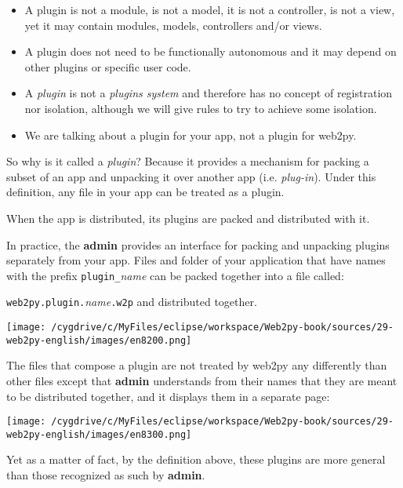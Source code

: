 \documentclass[justified,sixbynine,notoc]{tufte-book}
\def\ft{\small\tt}
\begin{document}
\begin{fullwidth}
\begin{itemize}
\item A plugin is not a module, is not a model, it is not a controller, is not a view, yet it may contain modules, models, controllers and/or views.

\item A plugin does not need to be functionally autonomous and it may depend on other plugins or specific user code.

\item A {\it plugin} is not a {\it plugins system} and therefore has no concept of registration nor isolation, although we will give rules to try to achieve some isolation.

\item We are talking about a plugin for your app, not a plugin for web2py.
\end{itemize}

So why is it called a {\it plugin}? Because it provides a mechanism for packing a subset of an app and unpacking it over another app (i.e. {\it plug-in}). Under this definition, any file in your app can be treated as a plugin.

When the app is distributed, its plugins are packed and distributed with it.

In practice, the {\bf admin} provides an interface for packing and unpacking plugins separately from your app. Files and folder of your application that have names with the prefix {\ft plugin\_}{\it name} can be packed together into a file called:

{\ft web2py.plugin.}{\it name}{\ft .w2p}
\noindent and distributed together.


\goodbreak\begin{center}\texttt{[image: /cygdrive/c/MyFiles/eclipse/workspace/Web2py-book/sources/29-web2py-english/images/en8200.png]}\end{center}


The files that compose a plugin are not treated by web2py any differently than other files except that {\bf admin} understands from their names that they are meant to be distributed together, and it displays them in a separate page:


\goodbreak\begin{center}\texttt{[image: /cygdrive/c/MyFiles/eclipse/workspace/Web2py-book/sources/29-web2py-english/images/en8300.png]}\end{center}


Yet as a matter of fact, by the definition above, these plugins are more general than those recognized as such by {\bf admin}.


\end{fullwidth}
\end{document}
